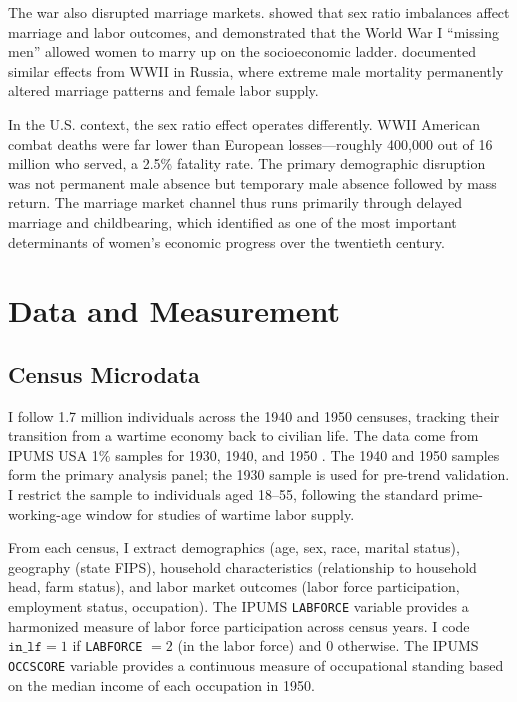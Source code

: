 \documentclass[12pt]{article}
\begin{document}
The war also disrupted marriage markets. \citet{angrist2002sex} showed that sex ratio imbalances affect marriage and labor outcomes, and \citet{abramitzky2011marrying} demonstrated that the World War I ``missing men'' allowed women to marry up on the socioeconomic ladder. \citet{brainerd2017lasting} documented similar effects from WWII in Russia, where extreme male mortality permanently altered marriage patterns and female labor supply.

In the U.S. context, the sex ratio effect operates differently. WWII American combat deaths were far lower than European losses---roughly 400,000 out of 16 million who served, a 2.5\% fatality rate. The primary demographic disruption was not permanent male absence but temporary male absence followed by mass return. The marriage market channel thus runs primarily through delayed marriage and childbearing, which \citet{goldin1990understanding} identified as one of the most important determinants of women's economic progress over the twentieth century.



\section{Data and Measurement}
\label{sec:data}

\subsection{Census Microdata}

I follow 1.7 million individuals across the 1940 and 1950 censuses, tracking their transition from a wartime economy back to civilian life. The data come from IPUMS USA 1\% samples for 1930, 1940, and 1950 \citep{ruggles2024ipums}. The 1940 and 1950 samples form the primary analysis panel; the 1930 sample is used for pre-trend validation. I restrict the sample to individuals aged 18--55, following the standard prime-working-age window for studies of wartime labor supply.

From each census, I extract demographics (age, sex, race, marital status), geography (state FIPS), household characteristics (relationship to household head, farm status), and labor market outcomes (labor force participation, employment status, occupation). The IPUMS \texttt{LABFORCE} variable provides a harmonized measure of labor force participation across census years. I code $\texttt{in\_lf} = 1$ if \texttt{LABFORCE} $= 2$ (in the labor force) and 0 otherwise. The IPUMS \texttt{OCCSCORE} variable provides a continuous measure of occupational standing based on the median income of each occupation in 1950.
\end{document}
